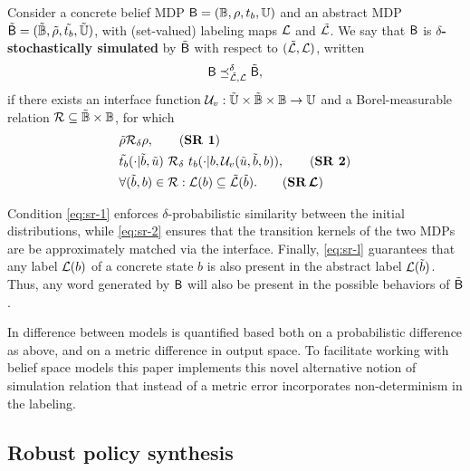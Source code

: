 \documentclass{ifacconf}
\begin{document}
\begin{definition}
\label{def:apbsim}
Consider a concrete belief MDP $\mathsf{B} = (\mathbb{B}, \rho, t_b, {\mathbb{U}})$ and an abstract MDP $\tilde{\mathsf{B}} = (\tilde {\mathbb{B}}, \tilde \rho, \tilde {t_b}, \tilde {{\mathbb{U}}})$, with (set-valued) labeling maps $\mathcal{L}$ and  $\tilde{\mathcal{L}}$. We say that	$\mathsf{B}$ is \textbf{$\delta$-stochastically simulated} by $\tilde {\mathsf{B}}$ with respect to $(\tilde{\mathcal{L}},\mathcal{L})$, written 
\begin{equation}
  {\mathsf{B}}\preceq^{\delta}_{\tilde{\mathcal{L}},\mathcal{L}} \tilde {\mathsf{B}},
\end{equation} 
if there exists an interface function $\mathcal{U}_{v} : \tilde {{\mathbb{U}}} \times \tilde {\mathbb{B}} \times \mathbb{B} \rightarrow {\mathbb{U}}$ and a Borel-measurable relation $\mathcal{R}\subseteq \tilde {\mathbb{B}}\times \mathbb{B}$, for which 	
\begin{align}
  \label{eq:sr-1} & \tilde\init \bar \rel_\delta \init, \tag{\textbf{SR 1}} \\
  \label{eq:sr-2} & \tilde \trb(\cdot| \tilde b, \tilde u)\ \bar \rel_\delta \  \trb(\cdot| b, \InF(\tilde u,\tilde b,b)), \tag{\textbf{SR 2}} \\
  \label{eq:sr-l} & \forall (\tilde b,b)\in \rel:  \Labset(b)\subseteq \tilde{\Labset}(\tilde b). \tag{\textbf{SR$\,\boldsymbol{\CA{L}}$}}
\end{align} 
\end{definition}

Condition \eqref{eq:sr-1} enforces $\delta$-probabilistic similarity between the initial distributions, while \eqref{eq:sr-2} ensures that the transition kernels of the two MDPs are be approximately matched via the interface. Finally, \eqref{eq:sr-l} guarantees that any label $\mathcal{L}(b)$ of a concrete state $b$ is also present in the abstract label $\mathcal{L}(\tilde b)$. Thus, any word generated by $\mathsf{B}$ will also be present in the possible behaviors of $\tilde {\mathsf{B}}$.

In \citet{haesaert2017verification} difference between models is quantified based both on a probabilistic difference as above, and on a metric difference in output space. To facilitate working with belief space models this paper implements this novel alternative notion of simulation relation that instead of a metric error incorporates non-determinism in the labeling.


\subsection{Robust policy synthesis}
\end{document}
